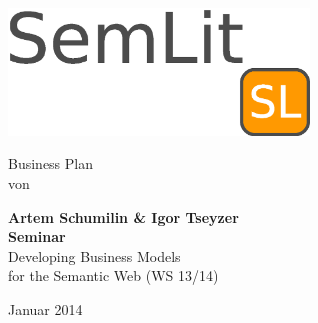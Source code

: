 \documentclass[12pt, a4paper]{article} %
\begin{document}
\thispagestyle{empty}

\begin{titlepage}
\begin{center}

\hbox{}
\vskip 1.8cm

\includegraphics[width=0.6\textwidth]{./logo}~

\hbox{}
\vfill
\vskip 1cm
Business Plan\\
von\\[2mm]
\vskip 1cm

{\large\bfseries Artem Schumilin \& Igor Tseyzer\\}
\vskip 4cm
{\bfseries Seminar}\\
Developing Business Models \\
for the Semantic Web (WS 13/14) \\
\vskip 2cm

\vskip 1cm
Januar 2014

\end{center}
\vfill
\end{titlepage}


\tableofcontents
\newpage



\newpage


\newpage


\newpage


\newpage


\newpage


\newpage


\newpage
\end{document}
